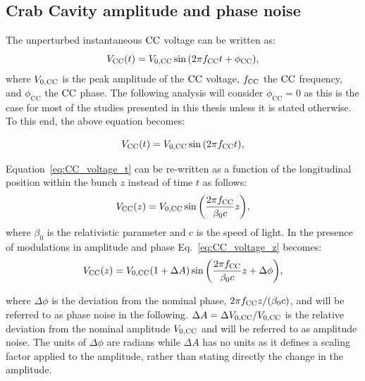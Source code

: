 \subsection{Crab Cavity amplitude and phase noise}\label{subsec:AN_PN}
The unperturbed instantaneous ${\mathrm{CC}}$ voltage can be written as:
\begin{equation}\label{eq:CC_voltage_t_phase}
    V_\mathrm{CC}(t) = {V_\mathrm{0, CC}} \sin{\left ( 2 \pi {f_\mathrm{CC}}t + \phi_\mathrm{CC} \right )},
\end{equation}
where ${V_\mathrm{0, CC}}$ is the peak amplitude of the ${\mathrm{CC}}$ voltage, ${f_\mathrm{CC}}$ the ${\mathrm{CC}}$ frequency, and $\phi_\mathrm{CC}$ the ${\mathrm{CC}}$ phase. The following analysis will consider $\phi_\mathrm{CC}=0$ as this is the case for most of the studies presented in this thesis unless it is stated otherwise. To this end, the above equation becomes: 

\begin{equation}\label{eq:CC_voltage_t}
    V_\mathrm{CC}(t) = {V_\mathrm{0, CC}} \sin{\left ( 2 \pi {f_\mathrm{CC}}t \right )},
\end{equation}

Equation~\eqref{eq:CC_voltage_t} can be re-written as a function of the longitudinal position within the bunch $z$ instead of time $t$ as follows:
\begin{equation}\label{eq:CC_voltage_z}
    V_\mathrm{CC}(z) = {V_\mathrm{0, CC}} \sin{\left ( \frac{2\pi {f_\mathrm{CC}}}{\beta_0 c}z \right )},
\end{equation}
where $\beta_0$ is the relativistic parameter and $c$ is the speed of light. %
In the presence of modulations in amplitude and phase Eq.~\eqref{eq:CC_voltage_z} becomes:%
\begin{equation}\label{eq:CC_voltage_z_noise}
    V_\mathrm{CC}(z) = {V_\mathrm{0, CC}} (1+\Delta A) \sin{\left ( \frac{2\pi {f_\mathrm{CC}}}{\beta_0 c}z + \Delta \phi \right )},
\end{equation}

where $\Delta \phi$ is the deviation from the nominal phase, $2\pi {f_\mathrm{CC}} z/(\beta_0 c)$, and will be referred to as phase noise in the following. $\Delta A = \Delta {V_\mathrm{0, CC}} / {V_\mathrm{0, CC}}$ is the relative deviation from the nominal amplitude ${V_\mathrm{0, CC}}$ and will be referred to as amplitude noise. The units of $\Delta \phi$ are radians while $\Delta A$ has no units as it defines a scaling factor applied to the amplitude, rather than stating directly the change in the amplitude.

